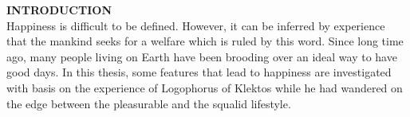 \noindent\textbf{INTRODUCTION}
\\

Happiness is difficult to be defined. However, it can be inferred by experience that the mankind seeks for a welfare which is ruled by this word. Since long time ago, many people living on Earth have been brooding over an ideal way to have good days. In this thesis, some features that lead to happiness are investigated with basis on the experience of Logophorus of Klektos while he had wandered on the edge between the pleasurable and the squalid lifestyle. 

